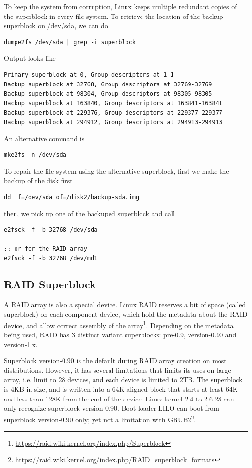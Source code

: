 To keep the system from corruption, Linux keeps multiple redundant copies of the
superblock in every file system. To retrieve the location of the backup
superblock on /dev/sda, we can do
\begin{verbatim}
dumpe2fs /dev/sda | grep -i superblock
\end{verbatim}
Output looks like
\begin{verbatim}
Primary superblock at 0, Group descriptors at 1-1
Backup superblock at 32768, Group descriptors at 32769-32769
Backup superblock at 98304, Group descriptors at 98305-98305
Backup superblock at 163840, Group descriptors at 163841-163841
Backup superblock at 229376, Group descriptors at 229377-229377
Backup superblock at 294912, Group descriptors at 294913-294913
\end{verbatim}
An alternative command is 
\begin{verbatim}
mke2fs -n /dev/sda
\end{verbatim}

To repair the file system using the alternative-superblock, first we make the
backup of the disk first
\begin{verbatim}
dd if=/dev/sda of=/disk2/backup-sda.img
\end{verbatim}
then, we pick up one of the backuped superblock and call
\begin{verbatim}
e2fsck -f -b 32768 /dev/sda

;; or for the RAID array
e2fsck -f -b 32768 /dev/md1
\end{verbatim}

\subsection{RAID Superblock}

A RAID array is also a special device. Linux RAID reserves a bit of space
(called superblock) on each component device, which hold the metadata about the
RAID device, and allow correct assembly of the
array\footnote{\url{https://raid.wiki.kernel.org/index.php/Superblock}}.
Depending on the metadata being used, RAID has 3 distinct variant superblocks:
pre-0.9,  version-0.90 and version-1.x.

Superblock version-0.90 is the default during RAID array creation on most
distributions. However, it has several limitations that limits its uses on large
array, i.e. limit to 28 devices, and each device is limited to 2TB. The
superblock is 4KB  in size, and is written into a 64K aligned block that starts
at least 64K and less than 128K from the end of the device.
Linux kernel 2.4 to 2.6.28 can only recognize superblock version-0.90.
Boot-loader LILO can boot from superblock version-0.90 only; yet not a
limitation with GRUB2\footnote{\url{https://raid.wiki.kernel.org/index.php/RAID_superblock_formats}}.


